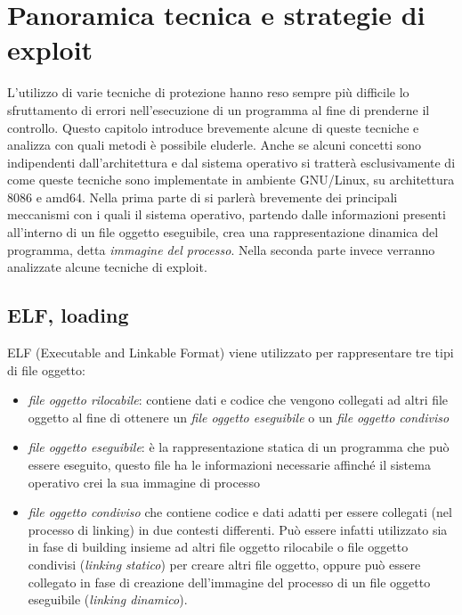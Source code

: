 \chapter{Panoramica tecnica e strategie di exploit}

L'utilizzo di varie tecniche di protezione hanno reso sempre più
difficile lo sfruttamento di errori nell'esecuzione di un programma al
fine di prenderne il controllo. Questo capitolo introduce brevemente
alcune di queste tecniche e analizza con quali metodi è possibile
eluderle. Anche se alcuni concetti sono indipendenti dall'architettura
e dal sistema operativo si tratterà esclusivamente di come queste
tecniche sono implementate in ambiente GNU/Linux, su architettura 8086
e amd64. Nella prima parte di si parlerà brevemente dei principali
meccanismi con i quali il sistema operativo, partendo dalle
informazioni presenti all'interno di un file oggetto eseguibile, crea
una rappresentazione dinamica del programma, detta \emph{immagine del
  processo}. Nella seconda parte invece verranno analizzate alcune
tecniche di exploit.

\section{ELF, loading}

ELF (Executable and Linkable Format) viene utilizzato per 
rappresentare tre tipi di file oggetto:

\begin{itemize}
  \item \emph{file oggetto rilocabile}: contiene dati e codice che
    vengono collegati ad altri file oggetto al fine di ottenere un
    \emph{file oggetto eseguibile} o un \emph{file oggetto condiviso}

  \item \emph{file oggetto eseguibile}: è la rappresentazione statica
    di un programma che può essere eseguito, questo file ha le
    informazioni necessarie affinché il sistema operativo crei la sua
    immagine di processo

  \item \emph{file oggetto condiviso} che contiene codice e dati
    adatti per essere collegati (nel processo di linking) in due
    contesti differenti. Può essere infatti utilizzato sia in fase di
    building insieme ad altri file oggetto rilocabile o file oggetto
    condivisi (\emph{linking statico}) per creare altri file oggetto,
    oppure può essere collegato in fase di creazione dell'immagine del
    processo di un file oggetto eseguibile (\emph{linking dinamico}).

\end{itemize}

